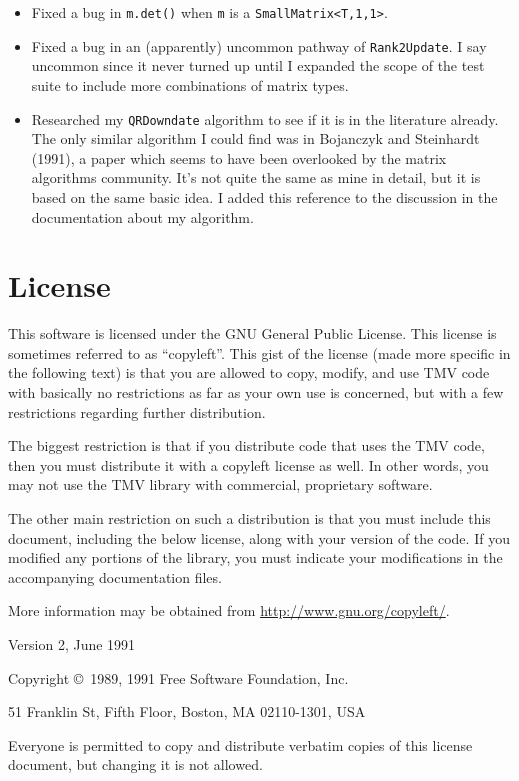 \documentclass[twoside,letterpaper,11pt]{article}
\renewcommand{\tt}[1]{{\lstinline {#1}}}
\begin{document}
\begin{description}
\begin{itemize}
\item Fixed a bug in \tt{m.det()} when \tt{m} is a \tt{SmallMatrix<T,1,1>}.

\item Fixed a bug in an (apparently) uncommon pathway of \tt{Rank2Update}.
I say uncommon since it never turned up until I expanded the scope of
the test suite to include more combinations of matrix types.

\item Researched my \tt{QRDowndate} algorithm to see if it is in the literature already.
The only similar algorithm I could find was in Bojanczyk and Steinhardt (1991), 
a paper which seems to have been overlooked by the matrix algorithms community.
It's not quite the same as mine in detail, but it is based on the same basic idea.
I added this reference to the discussion in the documentation about my algorithm.

\end{itemize}

\end{description}

\newpage
\section{License}
\label{License}

This software is licensed under the GNU General Public License.  This license is
sometimes referred to as ``copyleft''.  This gist of the license (made more specific
in the following text) is that you are allowed to copy, modify, and use TMV code
with basically no restrictions as far as your own use is concerned, 
but with a few restrictions regarding further distribution.

The biggest restriction is that if you distribute code that
uses the TMV code, then you must distribute it with a copyleft license as well.
In other words, you may not use the TMV library with commercial, proprietary 
software. 

The other main restriction on such a distribution is that you must include this 
document,
including the below license, along with your version of the code.  If you modified
any portions of the library, you must indicate your modifications in the accompanying
documentation files.

More information may be obtained from \url{http://www.gnu.org/copyleft/}.

\begin{center}
{\parindent 0in

Version 2, June 1991

Copyright \copyright\ 1989, 1991 Free Software Foundation, Inc.

\bigskip

51 Franklin St, Fifth Floor, Boston, MA  02110-1301, USA

\bigskip

Everyone is permitted to copy and distribute verbatim copies
of this license document, but changing it is not allowed.
}
\end{center}
\end{document}

